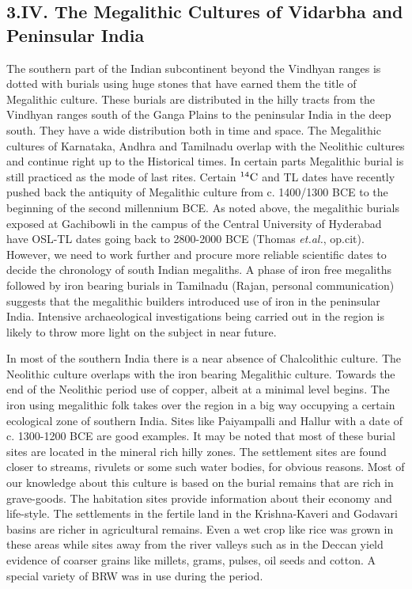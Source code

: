 \subsection*{3.IV. The Megalithic Cultures of Vidarbha and\\ Peninsular India}\label{subsection-11}

The southern part of the Indian subcontinent beyond the Vindhyan ranges is dotted with burials using huge stones that have earned them the title of Megalithic culture. These burials are distributed in the hilly tracts from the Vindhyan ranges south of the Ganga Plains to the peninsular India in the deep south. They have a wide distribution both in time and space. The Megalithic cultures of Karnataka, Andhra and Tamilnadu overlap with the Neolithic cultures and continue right up to the Historical times. In certain parts Megalithic burial is still practiced as the mode of last rites. Certain $^{14}{\rm C}$ and TL dates have recently pushed back the antiquity of Megalithic culture from c. 1400/1300 BCE to the beginning of the second millennium BCE. As noted above, the megalithic burials exposed at Gachibowli in the campus of the Central University of Hyderabad have OSL-TL dates going back to 2800-2000 BCE (Thomas \textit{et.al.}, op.cit). However, we need to work further and procure more reliable scientific dates to decide the chronology of south Indian megaliths. A phase of iron free megaliths followed by iron bearing burials in Tamilnadu (Rajan, personal communication) suggests that the megalithic builders introduced use of iron in the peninsular India. Intensive archaeological investigations being carried out in the region is likely to throw more light on the subject in near future.

In most of the southern India there is a near absence of Chalcolithic culture. The Neolithic culture overlaps with the iron bearing Megalithic culture. Towards the end of the Neolithic period use of copper, albeit at a minimal level begins. The iron using megalithic folk takes over the region in a big way occupying a certain ecological zone of southern India. Sites like Paiyampalli and Hallur with a date of c. 1300-1200 BCE are good examples. It may be noted that most of these burial sites are located in the mineral rich hilly zones. The settlement sites are found closer to streams, rivulets or some such water bodies, for obvious reasons. Most of our knowledge about this culture is based on the burial remains that are rich in grave-goods. The habitation sites provide information about their economy and life-style. The settlements in the fertile land in the Krishna-Kaveri and Godavari basins are richer in agricultural remains. Even a wet crop like rice was grown in these areas while sites away from the river valleys such as in the Deccan yield evidence of coarser grains like millets, grams, pulses, oil seeds and cotton. A special variety of BRW was in use during the period. 


